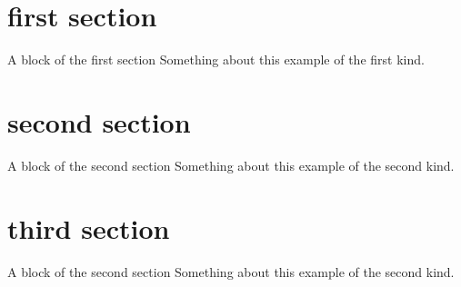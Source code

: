 \documentclass[]{beamer}
\begin{document}
\section{first section}
\begin{frame}
    \begin{block}{A  block of the first section}
        Something about this example of the first kind.
    \end{block}
    \end{frame}
\section{second section}
    \begin{frame}
    \begin{block}{A  block of the second section}
        Something about this example of the second kind.
    \end{block}
\end{frame}

\section{third section}
    \begin{frame}
    \begin{block}{A  block of the second section}
        Something about this example of the second kind.
    \end{block}
\end{frame}
\end{document}
